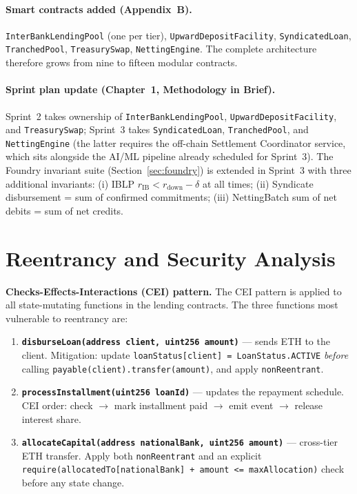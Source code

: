 \documentclass[12pt,a4paper]{report}
\begin{document}
\paragraph{Smart contracts added (Appendix~B).}
\texttt{InterBankLendingPool} (one per tier), \texttt{UpwardDepositFacility}, \texttt{SyndicatedLoan}, \texttt{TranchedPool}, \texttt{TreasurySwap}, \texttt{NettingEngine}. The complete architecture therefore grows from nine to fifteen modular contracts.

\paragraph{Sprint plan update (Chapter~1, Methodology in Brief).}
Sprint~2 takes ownership of \texttt{InterBankLendingPool}, \texttt{UpwardDepositFacility}, and \texttt{TreasurySwap}; Sprint~3 takes \texttt{SyndicatedLoan}, \texttt{TranchedPool}, and \texttt{NettingEngine} (the latter requires the off-chain Settlement Coordinator service, which sits alongside the AI/ML pipeline already scheduled for Sprint~3). The Foundry invariant suite (Section~\ref{sec:foundry}) is extended in Sprint~3 with three additional invariants: (i) IBLP $r_{\text{IB}} < r_{\text{down}} - \delta$ at all times; (ii) Syndicate disbursement = sum of confirmed commitments; (iii) NettingBatch sum of net debits = sum of net credits.

\section{Reentrancy and Security Analysis}

\textbf{Checks-Effects-Interactions (CEI) pattern.} The CEI pattern is applied to all state-mutating functions in the lending contracts. The three functions most vulnerable to reentrancy are:

\begin{enumerate}[noitemsep]
\item \textbf{\texttt{disburseLoan(address client, uint256 amount)}} --- sends ETH to the client. Mitigation: update \texttt{loanStatus[client] = LoanStatus.ACTIVE} \emph{before} calling \texttt{payable(client).transfer(amount)}, and apply \texttt{nonReentrant}.
\item \textbf{\texttt{processInstallment(uint256 loanId)}} --- updates the repayment schedule. CEI order: check $\to$ mark installment paid $\to$ emit event $\to$ release interest share.
\item \textbf{\texttt{allocateCapital(address nationalBank, uint256 amount)}} --- cross-tier ETH transfer. Apply both \texttt{nonReentrant} and an explicit \texttt{require(allocatedTo[nationalBank] + amount <= maxAllocation)} check before any state change.
\end{enumerate}
\end{document}
